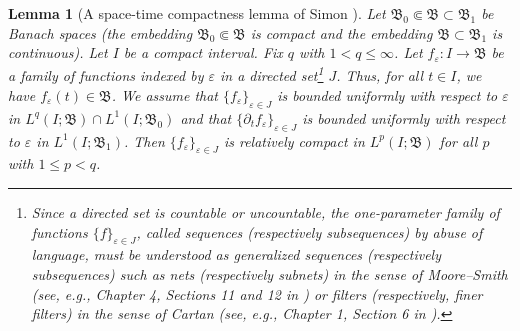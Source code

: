 \documentclass[11pt,reqno]{amsart}
\newtheorem{lemma}{Lemma}
\begin{document}
\begin{lemma}[A space-time compactness lemma of Simon \cite{Sim86}]
  \label{lem:ALL}
  Let $\mathfrak B_0 \Subset \mathfrak B \subset \mathfrak B_1$  be Banach spaces (the embedding $\mathfrak B_0  \Subset \mathfrak B$ is compact and the embedding $\mathfrak B \subset \mathfrak B_1$ is continuous).
  Let $I$ be a compact interval. Fix $ q $ with $1<q \leq \infty$. Let $ f_\varepsilon : I \rightarrow \mathfrak B $ be a family of functions indexed by $ \varepsilon $ in a directed set\footnote{Since a directed set \cite{Bor98,Kel75} is  countable or uncountable, the one-parameter family of functions $\{f\}_{\varepsilon \in J}$, called sequences (respectively subsequences) by abuse of language, must be understood as generalized sequences (respectively subsequences) such as nets (respectively subnets) in the sense of Moore--Smith (see, e.g., Chapter 4, Sections 11 and 12 in \cite{Wil70})  or filters (respectively, finer filters) in the sense of Cartan (see, e.g., Chapter 1, Section 6 in \cite{NB89}).} $ J $. Thus, for all $ t \in I $, we have $ f_\varepsilon (t) \in \mathfrak B $. We assume that $\{f_\varepsilon\}_{\varepsilon \in J}$ is bounded uniformly with respect to $ \varepsilon $ in $L^q(I; \mathfrak B) \cap L^1(I; \mathfrak B_0)$
  and that $\{\partial_t f_\varepsilon \}_{\varepsilon \in J}$ is  bounded uniformly with respect to $\varepsilon$ in $L^1(I; \mathfrak B_1)$. Then  $\{f_\varepsilon \}_{\varepsilon \in J}$ is relatively compact in
  $L^p(I; \mathfrak B)$ for all $ p $ with $1\leq p <q$.
\end{lemma}
\end{document}
